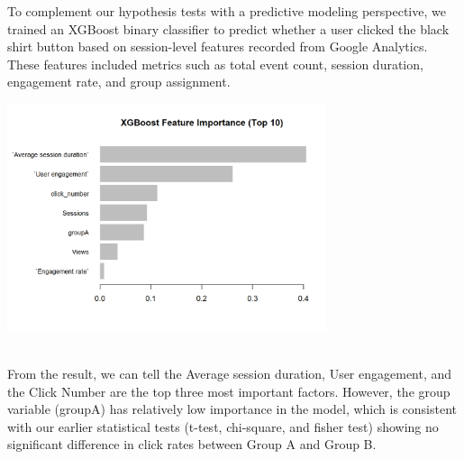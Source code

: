 \documentclass[
  letterpaper,
  DIV=11,
  numbers=noendperiod]{scrartcl}
\begin{document}
To complement our hypothesis tests with a predictive modeling
perspective, we trained an XGBoost binary classifier to predict whether
a user clicked the black shirt button based on session-level features
recorded from Google Analytics. These features included metrics such as
total event count, session duration, engagement rate, and group
assignment.\\
\begin{center}
\includegraphics[width=0.7\textwidth,height=\textheight]{data_ana_pj3_files/figure-html/unnamed-chunk-8-1.png}
\end{center}
\\
From the result, we can tell the Average session duration, User
engagement, and the Click Number are the top three most important
factors. However, the group variable (groupA) has relatively low
importance in the model, which is consistent with our earlier
statistical tests (t-test, chi-square, and fisher test) showing no
significant difference in click rates between Group A and Group B.\\
\end{document}
